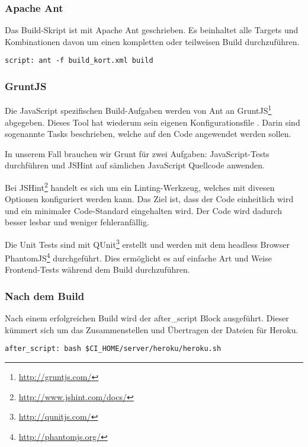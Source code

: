 \subsubsection{Apache Ant}
Das Build-Skript ist mit Apache Ant geschrieben.
Es beinhaltet alle Targets und Kombinationen davon um einen kompletten oder teilweisen Build durchzuführen.

\begin{lstlisting}[float, caption=Build-Skript in .travis.yml, label=travis-yml-build-script]
script: ant -f build_kort.xml build
\end{lstlisting}

\subsubsection{GruntJS}
Die JavaScript spezifischen Build-Aufgaben werden von Ant an GruntJS\footnote{\url{http://gruntjs.com/}} abgegeben.
Dieses Tool hat wiederum sein eigenen Konfigurationsfile .
Darin sind sogenannte Tasks beschrieben, welche auf den Code angewendet werden sollen.

In unserem Fall brauchen wir Grunt für zwei Aufgaben: JavaScript-Tests durchführen und JSHint auf sämlichen JavaScript Quellcode anwenden.

Bei JSHint\footnote{\url{http://www.jshint.com/docs/}} handelt es sich um ein Linting-Werkzeug, welches mit divesen Optionen konfiguriert werden kann.
Das Ziel ist, dass der Code einheitlich wird und ein minimaler Code-Standard eingehalten wird.
Der Code wird dadurch besser lesbar und weniger fehleranfällig.

Die Unit Tests sind mit QUnit\footnote{\url{http://qunitjs.com/}} erstellt und werden mit dem headless Browser PhantomJS\footnote{\url{http://phantomjs.org/}} durchgeführt.
Dies ermöglicht es auf einfache Art und Weise Frontend-Tests während dem Build durchzuführen.

\subsubsection{Nach dem Build}
Nach einem erfolgreichen Build wird der after\_script Block ausgeführt.
Dieser kümmert sich um das Zusammenstellen und Übertragen der Dateien für Heroku.

\begin{lstlisting}[float, caption=after\_script in travis.yml, label=travis-yml-after-script]
after_script: bash $CI_HOME/server/heroku/heroku.sh
\end{lstlisting}

